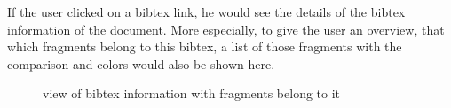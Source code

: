 If the user clicked on a bibtex link, he would see the details of the bibtex information of the document. More especially, to give the user an overview, that which fragments belong to this bibtex, a list of those fragments with the comparison and colors would also be shown here.

\begin{figure}[!h]
  \centering
  \caption{view of bibtex information with fragments belong to it}
  \label{fig:Bibliography_frag_view}
\end{figure}
